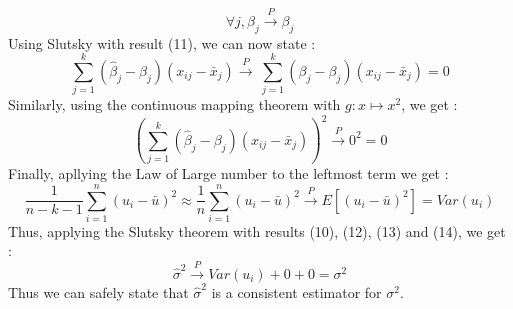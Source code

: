 \documentclass{article}
\begin{document}
\begin{equation}
    \forall j, \hat{\beta}_j \xrightarrow{P}\beta_j
\end{equation}
Using Slutsky with result (11), we can now state : 
\begin{equation}
    \sum_{j=1}^k (\hat{\beta}_j - \beta_j)(x_{ij} - \bar{x}_j) \xrightarrow{P}\ \sum_{j=1}^k(\beta_j-\beta_j)(x_{ij}-\bar{x}_j) = 0
\end{equation}
Similarly, using the continuous mapping theorem with $g:x \mapsto x^2 $, we get : 
\begin{equation}
     \left( \sum_{j=1}^k (\hat{\beta}_j - \beta_j)(x_{ij} - \bar{x}_j) \right)^2 \xrightarrow{P}0^2=0
\end{equation}
Finally, apllying the Law of Large number to the leftmost term we get : 
\begin{equation}
    \frac{1}{n-k-1}\sum_{i=1}^{n}(u_i-\bar{u})^2 \approx \frac{1}{n}\sum_{i=1}^{n}(u_i-\bar{u})^2\xrightarrow{P} E[(u_i-\bar{u})^2] = Var(u_i)
\end{equation}
Thus, applying the Slutsky theorem with results (10), (12), (13) and (14), we get : 
\begin{equation}
    \hat{\sigma}^2 \xrightarrow{P}Var(u_i) + 0 +0 = \sigma^2
\end{equation}
Thus we can safely state that $\hat{\sigma}^2$ is a consistent estimator for $\sigma^2$.
\end{document}
